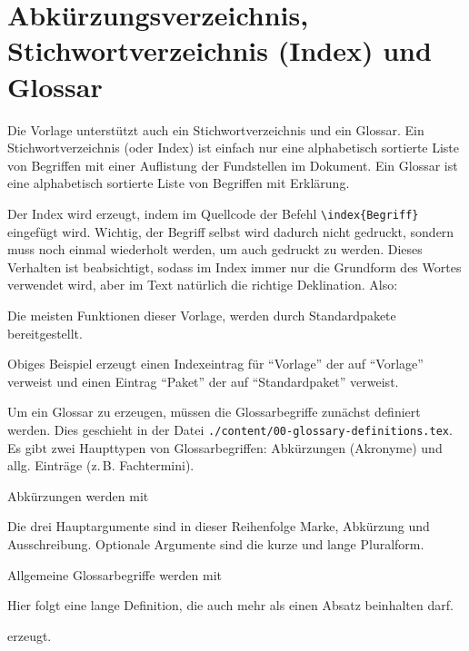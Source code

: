 \section{Abkürzungsverzeichnis, Stichwortverzeichnis (Index) und Glossar}%
\label{sec:Glossare}
%
Die Vorlage unterstützt auch ein Stichwortverzeichnis und ein Glossar. Ein
Stichwortverzeichnis (oder Index) ist einfach nur eine alphabetisch sortierte
Liste von Begriffen mit einer Auflistung der Fundstellen
im Dokument. Ein Glossar ist eine alphabetisch sortierte Liste von Begriffen mit
Erklärung.

Der Index wird erzeugt, indem im Quellcode der Befehl \verb#\index{Begriff}#
eingefügt wird. Wichtig, der Begriff selbst wird dadurch nicht gedruckt, sondern
muss noch einmal wiederholt werden, um auch gedruckt zu werden. Dieses Verhalten
ist beabsichtigt, sodass im Index immer nur die Grundform des Wortes verwendet
wird, aber im Text natürlich die richtige Deklination. Also:
\begin{latex}[caption={Beispiel für Index},label={lst:index}]
Die meisten Funktionen dieser Vorlage, werden durch
Standardpakete bereitgestellt.
\end{latex}
Obiges Beispiel erzeugt einen Indexeintrag für \enquote{Vorlage} der auf
\enquote{Vorlage} verweist und einen Eintrag \enquote{Paket} der auf 
\enquote{Standardpaket} verweist.

Um ein Glossar zu erzeugen, müssen die Glossarbegriffe zunächst definiert werden.
Dies geschieht in der Datei \texttt{./content/00-glossary-definitions.tex}.
Es gibt zwei Haupttypen von Glossarbegriffen: Abkürzungen (Akronyme) und allg.
Einträge (z.\,B. Fachtermini).

Abkürzungen werden mit
\begin{latex}[caption={Definition von Abkürzungen},label={lst:acro}]
\end{latex}
Die drei Hauptargumente sind in dieser Reihenfolge Marke, Abkürzung und
Ausschreibung. Optionale Argumente sind die kurze und lange Pluralform.

Allgemeine Glossarbegriffe werden mit
\begin{latex}[caption={Definition von allg. Glossareinträgen},label={lst:gls}]
%
{%
  Hier folgt eine lange Definition, die auch mehr als einen
	Absatz beinhalten darf.
}
\end{latex}
erzeugt.

